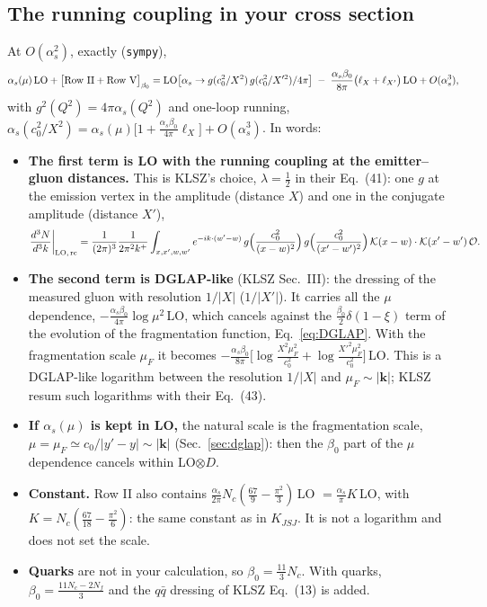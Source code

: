 \documentclass[10pt]{article}
\numberwithin{equation}{section}
\begin{document}
\subsection{The running coupling in your cross section}
At $O(\alpha_s^2)$, exactly (\texttt{sympy}),
\begin{equation}
\alpha_s(\mu)\,{\rm LO}+\big[\text{Row II}+\text{Row V}\big]_{\beta_0}={\rm LO}\big[\alpha_s\to g(c_0^2/X^2)\,g(c_0^2/X'^2)/4\pi\big]\;-\;\frac{\alpha_s\beta_0}{8\pi}\big(\ell_X+\ell_{X'}\big)\,{\rm LO}+O(\alpha_s^3),
\label{eq:rc}
\end{equation}
with $g^2(Q^2)=4\pi\alpha_s(Q^2)$ and one-loop running, $\alpha_s(c_0^2/X^2)=\alpha_s(\mu)\big[1+\frac{\alpha_s\beta_0}{4\pi}\ell_X\big]+O(\alpha_s^3)$. In words:
\begin{itemize}
\item \textbf{The first term is LO with the running coupling at the emitter--gluon distances.} This is KLSZ's choice, $\lambda=\frac12$ in their Eq.~(41): one $g$ at the emission vertex in the amplitude (distance $X$) and one in the conjugate amplitude (distance $X'$),
\begin{equation*}
\frac{d^3N}{d^3k}\bigg|_{\rm LO,\,rc}=\frac{1}{(2\pi)^3}\frac{1}{2\pi^2k^+}\int_{x,x',w,w'}e^{-ik\cdot(w'-w)}\,g\Big(\frac{c_0^2}{(x-w)^2}\Big)\,g\Big(\frac{c_0^2}{(x'-w')^2}\Big)\,\mathcal K(x-w)\cdot\mathcal K(x'-w')\,\mathcal O .
\end{equation*}
\item \textbf{The second term is DGLAP-like} (KLSZ Sec.~III): the dressing of the measured gluon with resolution $1/|X|$ ($1/|X'|$). It carries all the $\mu$ dependence, $-\frac{\alpha_s\beta_0}{4\pi}\log\mu^2\,$LO, which cancels against the $\frac{\beta_0}{2}\delta(1-\xi)$ term of the evolution of the fragmentation function, Eq.~\eqref{eq:DGLAP}. With the fragmentation scale $\mu_F$ it becomes $-\frac{\alpha_s\beta_0}{8\pi}\big[\log\frac{X^2\mu_F^2}{c_0^2}+\log\frac{X'^2\mu_F^2}{c_0^2}\big]\,$LO. This is a DGLAP-like logarithm between the resolution $1/|X|$ and $\mu_F\sim|\mathbf k|$; KLSZ resum such logarithms with their Eq.~(43).
\item \textbf{If $\alpha_s(\mu)$ is kept in LO,} the natural scale is the fragmentation scale, $\mu=\mu_F\simeq c_0/|y'-y|\sim|\mathbf k|$ (Sec.~\ref{sec:dglap}): then the $\beta_0$ part of the $\mu$ dependence cancels within LO$\otimes D$.
\item \textbf{Constant.} Row II also contains $\frac{\alpha_s}{2\pi}N_c(\frac{67}{9}-\frac{\pi^2}{3})\,$LO $=\frac{\alpha_s}{\pi}K\,$LO, with $K=N_c(\frac{67}{18}-\frac{\pi^2}{6})$: the same constant as in $K_{JSJ}$. It is not a logarithm and does not set the scale.
\item \textbf{Quarks} are not in your calculation, so $\beta_0=\frac{11}{3}N_c$. With quarks, $\beta_0=\frac{11N_c-2N_f}{3}$ and the $q\bar q$ dressing of KLSZ Eq.~(13) is added.
\end{itemize}
\end{document}
